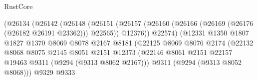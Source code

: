 \begin{lexlean}{RustCore}
\begin{coremodule}
                                              (@26134
                                                (@26142
                                                  (@26148
                                                    (@26151
                                                      (@26157
                                                        (@26160
                                                          (@26166
                                                            (@26169 (@26176 (@26182 @26191 @23362)))
                                                            @22565))
                                                        @12376))
                                                    @22574)
                                                  (@12331
                                                    @1350
                                                    @1807
                                                    @1827
                                                    @1370
                                                    @8069
                                                    @8078
                                                    @2167
                                                    @8181
                                                    (@22125
                                                      @8069
                                                      @8076
                                                      @2174
                                                      (@22132
                                                        @8068
                                                        @8075
                                                        @2145
                                                        @8051
                                                        @2151
                                                        @12373
                                                        (@22146
                                                          @8061
                                                          @2151
                                                          @22157
                                                          @19463
                                                          @9311
                                                          (@9294 (@9313 @8062 @2167)))
                                                        @9311
                                                        (@9294 (@9313 @8052 @8068)))
                                                      @9329
                                                      @9333

\end{coremodule}
\end{lexlean}
